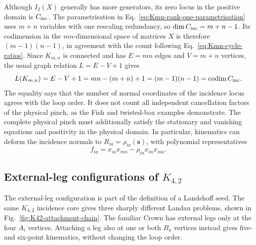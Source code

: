 \documentclass[a4paper,11pt]{article}
\begin{document}
Although \(I_2(X)\) generally has more generators, its zero locus in the
positive domain is \(C_{\rm inc}\).  The parametrisation in
Eq.~\eqref{eq:Kmn-rank-one-parametrisation} uses \(m+n\) variables with one
rescaling redundancy, so
\(\dim C_{\rm inc}=m+n-1\).  Its codimension in the \(mn\)-dimensional
space of matrices \(X\) is therefore \((m-1)(n-1)\), in agreement with the
count following Eq.~\eqref{eq:Kmn-cycle-ratios}.  Since \(K_{m,n}\) is
connected and has \(E=mn\) edges and \(V=m+n\) vertices, the usual graph
relation \(L=E-V+1\) gives
\begin{equation}
 L(K_{m,n})=E-V+1
 =mn-(m+n)+1=(m-1)(n-1)
 =\operatorname{codim} C_{\rm inc}.
 \label{eq:Kmn-determinantal-codimension}
\end{equation}
The equality says that the number of normal coordinates of the incidence
locus agrees with the loop order.  It does not count all independent
cancellation factors of the physical pinch, as the Fish and twisted-box
examples demonstrate.  The complete physical pinch must additionally satisfy
the stationary and vanishing equations and positivity in the physical
domain.  In particular, kinematics can deform the incidence normals to
\(R_{ia}=\rho_{ia}(\boldsymbol s)\), with polynomial representatives
\begin{equation}
 f_{ia}=x_{ia}x_{mn}-\rho_{ia}x_{in}x_{ma}.
 \label{eq:Kmn-deformed-minors}
\end{equation}

\subsection{External-leg configurations of \(K_{4,2}\)}
\label{sec:K42-external-attachments}

The external-leg configuration is part of the definition of a Landshoff seed.
The same \(K_{4,2}\) incidence core gives three sharply different Landau
problems, shown in Fig.~\ref{fig:K42-attachment-chain}.  The familiar Crown
has external legs only at the four \(A_i\) vertices.  Attaching a leg also
at one or both \(B_a\) vertices instead gives five- and six-point
kinematics, without changing the loop order.
\end{document}
